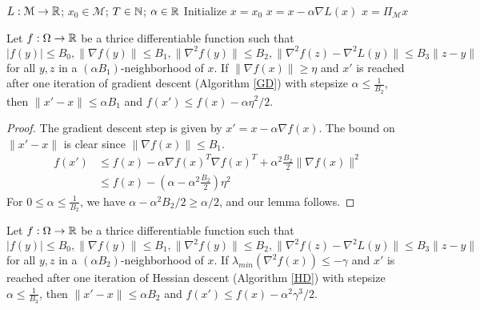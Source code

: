 %
%
\begin{algorithm}[hb]
 \caption{$x = GD(L,x_0, T,\alpha$)}
   \label{GD}
\begin{algorithmic}
    $L: \mathcal{M} \to {\mathbb{R}}$; $x_0 \in \mathcal{M}$; $T\in {\mathbb{N}}$; $\alpha\in {\mathbb{R}}$
   \State Initialize $x = x_0$
   \State $x = x - \alpha\nabla L(x)$
   \State $x = \Pi_\mathcal{M} x$
   \EndFor
\end{algorithmic}
\end{algorithm}

\begin{lemma}\label{GradDecrease}		
Let $f :\Omega \to {\mathbb{R}}$ be a thrice differentiable function such that $|f(y)| \leq B_0, \|\nabla f(y)\| \leq B_1, \|\nabla^2 f(y)\| \leq B_2,\|\nabla^2f (z)-\nabla^2L(y)\| \leq B_3\|z - y\|$ for all $y,z$ in a $(\alpha B_1)$-neighborhood of $x$. If $\|\nabla f (x) \|\geq \eta$ and $x'$ is reached after one iteration of gradient descent (Algorithm \ref{GD}) with stepsize $\alpha \leq \frac{1}{B_2}$, then $\|x' - x\| \leq \alpha B_1$ and $f(x') \leq f(x) - \alpha\eta^2/2$.
\end{lemma} 

\begin{proof}
The gradient descent step is given by $x' = x - \alpha \nabla f(x)$. The bound on $\|x' - x\|$ is clear since $\|\nabla f(x) \| \leq B_1$.
\begin{align*}
f(x') &\leq f(x) - \alpha \nabla f(x)^T\nabla f(x)^T + \alpha^2\frac{B_2}{2} \|\nabla f(x)\|^2 \\
&\leq f(x) - (\alpha - \alpha^2 \frac{B_2}{2}) \eta^2 
\end{align*}
For $0 \leq \alpha \leq \frac{1}{B_2}$, we have $\alpha - \alpha^2B_2/2 \geq \alpha/2$, and our lemma follows.
\end{proof}

\begin{lemma}\label{HessianDecrease}
Let $f :\Omega \to {\mathbb{R}}$ be a thrice differentiable function such that $|f(y)| \leq B_0, \|\nabla f(y)\| \leq B_1, \|\nabla^2 f(y)\| \leq B_2,\|\nabla^2f (z)-\nabla^2L(y)\| \leq B_3\|z - y\|$ for all $y,z$ in a $(\alpha B_2)$-neighborhood of $x$. If $\lambda_{min}(\nabla^2 f (x)) \leq -\gamma$ and $x'$ is reached after one iteration of Hessian descent (Algorithm \ref{HD}) with stepsize $\alpha \leq \frac{1}{B_3}$, then $\|x' - x\| \leq \alpha B_2$ and $f(x') \leq f(x) - \alpha^2 \gamma^3/2$.
\end{lemma}

